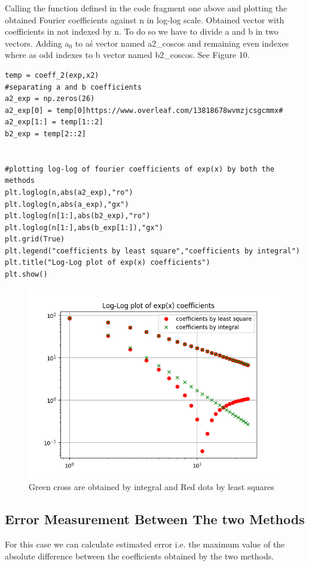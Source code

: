 \documentclass[a4paper]{article}
\begin{document}
Calling the function defined in the code fragment one above and plotting the obtained Fourier coefficients against n in log-log scale. Obtained vector with coefficients in not indexed by n. To do so we have to divide a and b in two vectors. Adding a$_{0}$ to a\'s vector named a2\_coscos and remaining even indexes where as odd indexes to b vector named b2\_coscos. See Figure 10.
\begin{lstlisting}
temp = coeff_2(exp,x2)
#separating a and b coefficients
a2_exp = np.zeros(26)
a2_exp[0] = temp[0]https://www.overleaf.com/13818678wvmzjcsgcmmx#
a2_exp[1:] = temp[1::2]
b2_exp = temp[2::2]


#plotting log-log of fourier coefficients of exp(x) by both the methods
plt.loglog(n,abs(a2_exp),"ro")
plt.loglog(n,abs(a_exp),"gx")
plt.loglog(n[1:],abs(b2_exp),"ro")
plt.loglog(n[1:],abs(b_exp[1:]),"gx")
plt.grid(True)
plt.legend("coefficients by least square","coefficients by integral")
plt.title("Log-Log plot of exp(x) coefficients")
plt.show()

\end{lstlisting}
\begin{figure}
\includegraphics[width=\columnwidth]{expxcoeffcom.png}
\caption{ Green cross are obtained by integral and Red dots by least squares }
\end{figure}

\subsection{Error Measurement Between The two Methods}
For this case we can calculate estimated error i.e. the maximum value of the absolute difference between the coefficients obtained by the two methods.
\end{document}
